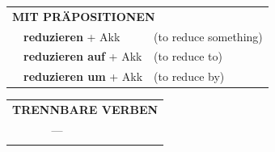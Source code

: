 \documentclass[10pt,a4paper]{revtex4-2}
\begin{document}
\begin{verbbox-acc}
\vspace{10pt}

\begin{tabular}{lll}
\multicolumn{3}{l}{\textbf{MIT PRÄPOSITIONEN}}\\
& \textbf{reduzieren} + Akk & (to reduce something)\\
& \textbf{reduzieren auf} + Akk & (to reduce to)\\
& \textbf{reduzieren um} + Akk & (to reduce by)\\
\end{tabular}
\hfill
\begin{tabular}{lll}
\multicolumn{3}{l}{\textbf{TRENNBARE VERBEN}}\\
& ---\\
\vspace{20pt}
\end{tabular}

\vspace{-5pt}
\end{verbbox-acc}
\end{document}

